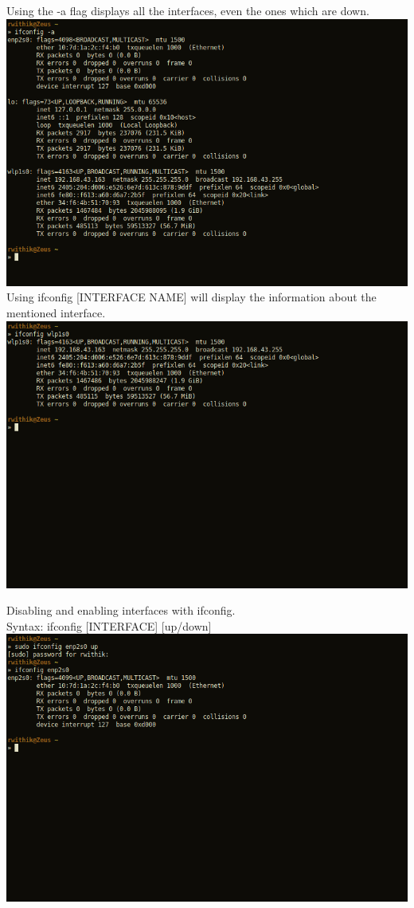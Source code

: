 \documentclass[10pt,a4paper]{report}
\begin{document}
\begin{flushleft}
\pagebreak
Using the -a flag displays all the interfaces, even the ones which are down.\\
\medskip
\includegraphics[scale=.5]{../Images/Network/2.png}\\
\medskip
Using {\color {red} ifconfig [INTERFACE NAME]} will display the information about the mentioned interface.\\\medskip
\includegraphics[scale=.5]{../Images/Network/3.png}

\pagebreak
Disabling and enabling interfaces with ifconfig.\\
Syntax: {\color{red} ifconfig [INTERFACE] [up/down]}\\\medskip
\includegraphics[scale=.5]{../Images/Network/4.png}\\\medskip


\end{flushleft}
\end{document}
